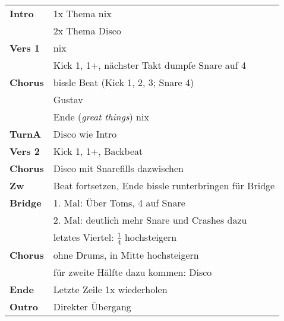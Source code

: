 
\begin{tabular}{p{1.6cm}l}
	\textbf{Intro}  & 1x Thema nix                                          \\
	                & 2x Thema Disco                                        \\
	\textbf{Vers 1} & nix                                                   \\
	                & Kick 1, 1+, nächster Takt dumpfe Snare auf 4          \\
	\textbf{Chorus} & bissle Beat (Kick 1, 2, 3; Snare 4)                   \\
	                & Gustav                                                \\
	                & Ende (\textit{great things}) nix                      \\
	\textbf{TurnA}  & Disco wie Intro                                       \\
	\textbf{Vers 2} & Kick 1, 1+, Backbeat                                  \\
	\textbf{Chorus} & Disco mit Snarefills dazwischen                       \\
	\textbf{Zw}     & Beat fortsetzen, Ende bissle runterbringen für Bridge \\
	\textbf{Bridge} & 1. Mal: Über Toms, 4 auf Snare                        \\
	                & 2. Mal: deutlich mehr Snare und Crashes dazu          \\
	                & letztes Viertel: $\frac{1}{4}$ hochsteigern           \\
	\textbf{Chorus} & ohne Drums, in Mitte hochsteigern                     \\
	                & für zweite Hälfte dazu kommen: Disco                  \\
	\textbf{Ende}   & Letzte Zeile 1x wiederholen                           \\
	\textbf{Outro}  & Direkter Übergang                                     \\
\end{tabular}
